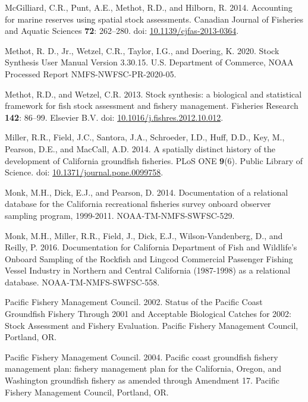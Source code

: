 \documentclass[
  english,
  a4paper,
]{article}
\newlength{\cslhangindent}
\newlength{\cslentryspacingunit} %
\newenvironment{CSLReferences}[2] %
 {%
  \setlength{\parindent}{0pt}
  \ifodd #1
  \let\oldpar\par
  \def\par{\hangindent=\cslhangindent\oldpar}
  \fi
  \setlength{\parskip}{#2\cslentryspacingunit}
 }%
 {}
\begin{document}
\begin{CSLReferences}{1}{0}
\leavevmode{}%
McGilliard, C.R., Punt, A.E., Methot, R.D., and Hilborn, R. 2014. {Accounting for marine reserves using spatial stock assessments}. Canadian Journal of Fisheries and Aquatic Sciences \textbf{72}: 262--280. doi: \href{https://doi.org/10.1139/cjfas-2013-0364}{10.1139/cjfas-2013-0364}.

\leavevmode{}%
Methot, R. D., Jr., Wetzel, C.R., Taylor, I.G., and Doering, K. 2020. {Stock Synthesis User Manual Version 3.30.15}. U.S. Department of Commerce, NOAA Processed Report NMFS-NWFSC-PR-2020-05.

\leavevmode{}%
Methot, R.D., and Wetzel, C.R. 2013. {Stock synthesis: a biological and statistical framework for fish stock assessment and fishery management}. Fisheries Research \textbf{142}: 86--99. Elsevier B.V. doi: \href{https://doi.org/10.1016/j.fishres.2012.10.012}{10.1016/j.fishres.2012.10.012}.

\leavevmode{}%
Miller, R.R., Field, J.C., Santora, J.A., Schroeder, I.D., Huff, D.D., Key, M., Pearson, D.E., and MacCall, A.D. 2014. {A spatially distinct history of the development of California groundfish fisheries}. PLoS ONE \textbf{9}(6). Public Library of Science. doi: \href{https://doi.org/10.1371/journal.pone.0099758}{10.1371/journal.pone.0099758}.

\leavevmode{}%
Monk, M.H., Dick, E.J., and Pearson, D. 2014. {Documentation of a relational database for the California recreational fisheries survey onboard observer sampling program, 1999-2011}. NOAA-TM-NMFS-SWFSC-529.

\leavevmode{}%
Monk, M.H., Miller, R.R., Field, J., Dick, E.J., Wilson-Vandenberg, D., and Reilly, P. 2016. {Documentation for California Department of Fish and Wildlife's Onboard Sampling of the Rockfish and Lingcod Commercial Passenger Fishing Vessel Industry in Northern and Central California (1987-1998) as a relational database}. NOAA-TM-NMFS-SWFSC-558.

\leavevmode{}%
Pacific Fishery Management Council. 2002. {Status of the Pacific Coast Groundfish Fishery Through 2001 and Acceptable Biological Catches for 2002: Stock Assessment and Fishery Evaluation.} Pacific Fishery Management Council, Portland, OR.

\leavevmode{}%
Pacific Fishery Management Council. 2004. {Pacific coast groundfish fishery management plan: fishery management plan for the California, Oregon, and Washington groundfish fishery as amended through Amendment 17}. Pacific Fishery Management Council, Portland, OR.


\end{CSLReferences}
\end{document}
